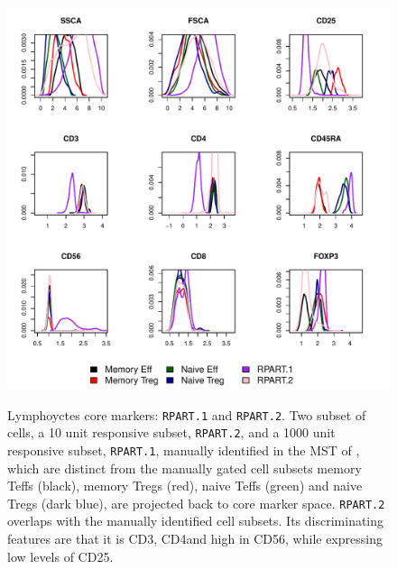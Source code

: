 \begin{figure}
\centering
\begin{minipage}{.8\textwidth}
\includegraphics[width=\linewidth]{figures/rpart-lymphocytes-clusters}
\end{minipage}
{  Lymphoyctes core markers: \texttt{RPART.1} and \texttt{RPART.2}.  }
{
 Two subset of cells, a 10 unit responsive subset, \texttt{RPART.2}, and a 1000 unit responsive subset, \texttt{RPART.1}, manually identified in the MST of , which are distinct from the manually gated cell subsets memory Teffs (black), memory Tregs (red), naive Teffs (green) and naive Tregs (dark blue), are projected back to core marker space.
 \texttt{RPART.2} overlaps with the manually identified cell subsets.
 Its discriminating features are that it is CD3\negative, CD4\negative and high in CD56, while expressing low levels of CD25.
}

\end{figure}
